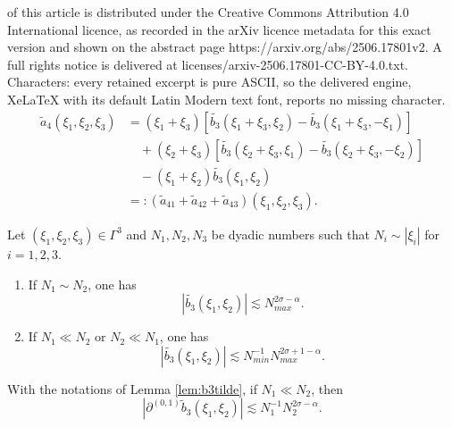 \documentclass[10pt,a4paper]{amsart}
\begin{document}
of this article is distributed under the Creative Commons Attribution 4.0 International licence, as recorded in the arXiv licence metadata for this exact version and shown on the abstract page https://arxiv.org/abs/2506.17801v2. A full rights notice is delivered at licenses/arxiv-2506.17801-CC-BY-4.0.txt. Characters: every retained excerpt is pure ASCII, so the delivered engine, XeLaTeX with its default Latin Modern text font, reports no missing character.
\begin{align}
\widetilde{a}_4(\xi_1, \xi_2, \xi_3) &= (\xi_1+\xi_3)\left[\widetilde{b_3}(\xi_1+\xi_3, \xi_2) - \widetilde{b_3}(\xi_1+\xi_3, -\xi_1)\right] \nonumber \\
&\quad + (\xi_2+\xi_3)\left[\widetilde{b_3}(\xi_2+\xi_3, \xi_1) - \widetilde{b_3}(\xi_2+\xi_3, -\xi_2)\right] \nonumber \\
&\quad - (\xi_1+\xi_2)\widetilde{b_3}(\xi_1, \xi_2) \nonumber \\
&=: (\widetilde{a}_{41} + \widetilde{a}_{42} + \widetilde{a}_{43})(\xi_1,\xi_2,\xi_3). \label{def:a4tilde}
\end{align}

\begin{lemma}\label{lem:b3tilde}
  Let $(\xi_1, \xi_2, \xi_3)\in \Gamma^3$ and $N_1,N_2,N_3$ be dyadic numbers such that $N_i\sim |\xi_i|$ for $i=1,2,3$. 
  \begin{enumerate}
    \item If $N_1\sim N_2$, one has
    \begin{equation}\label{lem:b3tilde.1}
    |\widetilde{b_3}(\xi_1, \xi_2)| \lesssim N_{max}^{2\sigma-\alpha}.
    \end{equation}
    \item If $N_1\ll N_2$ or $N_2\ll N_1$, one has
    \begin{equation}\label{lem:b3tilde.2}
    |\widetilde{b_3}(\xi_1, \xi_2)| \lesssim N_{min}^{-1} N_{max}^{2\sigma+1-\alpha}.
    \end{equation}
  \end{enumerate}
\end{lemma}

\begin{lemma}\label{lem:diff-b3tilde}
  With the notations of Lemma \ref{lem:b3tilde}, if $N_1\ll N_2$, then
  \begin{equation}\label{lem:diff-b3tilde.0}
    |\partial^{(0,1)}\widetilde{b}_3(\xi_1, \xi_2)| \lesssim N_1^{-1}N_2^{2\sigma-\alpha}.
  \end{equation}
\end{lemma}
\end{document}
